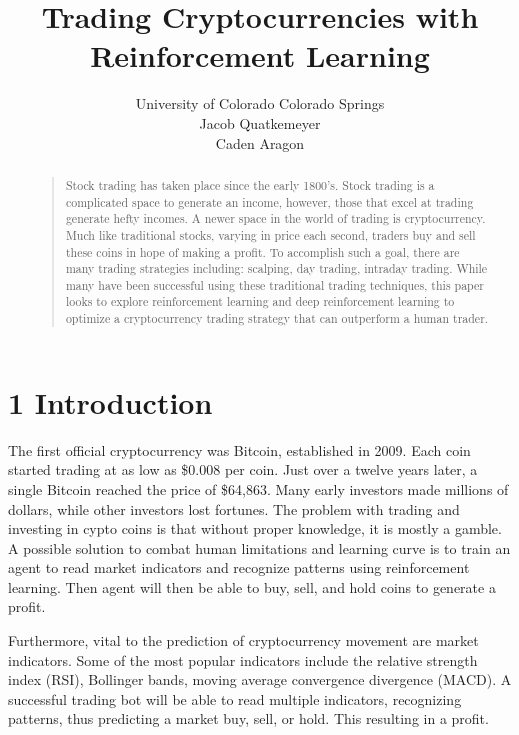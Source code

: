 \documentclass[letterpaper]{article}
\begin{document}
%
\title{Trading Cryptocurrencies with\\Reinforcement Learning}
\author{University of Colorado Colorado Springs\\Jacob Quatkemeyer\\Caden Aragon
}
\maketitle
\begin{abstract}
\begin{quote}
Stock trading has taken place since the early 1800's. Stock trading is a complicated space to generate an income, however, those that excel at trading generate hefty incomes. A newer space in the world of trading is cryptocurrency. Much like traditional stocks, varying in price each second, traders buy and sell these coins in hope of making a profit. To accomplish such a goal, there are many trading strategies including: scalping, day trading, intraday trading. While many have been successful using these traditional trading techniques, this paper looks to explore reinforcement learning and deep reinforcement learning to optimize a cryptocurrency trading strategy that can outperform a human trader.
\end{quote}
\end{abstract}

\section{1 Introduction}
\noindent The first official cryptocurrency was Bitcoin, established in 2009. Each coin started trading at as low as \$0.008 per coin. Just over a twelve years later, a single Bitcoin reached the price of \$64,863. Many early investors made millions of dollars, while other investors lost fortunes. The problem with trading and investing in cypto coins is that without proper knowledge, it is mostly a gamble. A possible solution to combat human limitations and learning curve is to train an agent to read market indicators and recognize patterns using reinforcement learning. Then agent will then be able to buy, sell, and hold coins to generate a profit.

Furthermore, vital to the prediction of cryptocurrency movement are market indicators. Some of the most popular indicators include the relative strength index (RSI), Bollinger bands, moving average convergence divergence (MACD). A successful trading bot will be able to read multiple indicators, recognizing patterns, thus predicting a market buy, sell, or hold. This resulting in a profit.
\end{document}
